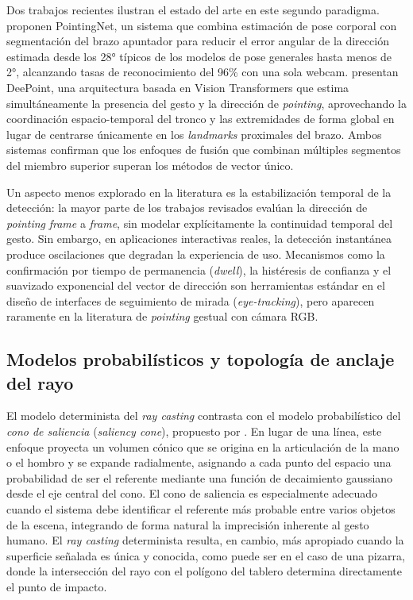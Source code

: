 \documentclass[12pt]{report} %
\begin{document}
Dos trabajos recientes ilustran el estado del arte en este segundo paradigma. \citet{bamani2025pointingnet} proponen PointingNet, un sistema que combina estimación de pose corporal con segmentación del brazo apuntador para reducir el error angular de la dirección estimada desde los 28° típicos de los modelos de pose generales hasta menos de 2°, alcanzando tasas de reconocimiento del 96\% con una sola webcam. \citet{nakamura2023deepoint} presentan DeePoint, una arquitectura basada en Vision Transformers que estima simultáneamente la presencia del gesto y la dirección de \textit{pointing}, aprovechando la coordinación espacio-temporal del tronco y las extremidades de forma global en lugar de centrarse únicamente en los \textit{landmarks} proximales del brazo. Ambos sistemas confirman que los enfoques de fusión que combinan múltiples segmentos del miembro superior superan los métodos de vector único.

Un aspecto menos explorado en la literatura es la estabilización temporal de la detección: la mayor parte de los trabajos revisados evalúan la dirección de \textit{pointing} \textit{frame} a \textit{frame}, sin modelar explícitamente la continuidad temporal del gesto. Sin embargo, en aplicaciones interactivas reales, la detección instantánea produce oscilaciones que degradan la experiencia de uso. Mecanismos como la confirmación por tiempo de permanencia (\textit{dwell}), la histéresis de confianza y el suavizado exponencial del vector de dirección son herramientas estándar en el diseño de interfaces de seguimiento de mirada (\textit{eye-tracking}), pero aparecen raramente en la literatura de \textit{pointing} gestual con cámara RGB.

\subsection{Modelos probabilísticos y topología de anclaje del rayo}

El modelo determinista del \textit{ray casting} contrasta con el modelo probabilístico del \textit{cono de saliencia} (\textit{saliency cone}), propuesto por \citet{kranstedt2005deixis}. En lugar de una línea, este enfoque proyecta un volumen cónico que se origina en la articulación de la mano o el hombro y se expande radialmente, asignando a cada punto del espacio una probabilidad de ser el referente mediante una función de decaimiento gaussiano desde el eje central del cono. El cono de saliencia es especialmente adecuado cuando el sistema debe identificar el referente más probable entre varios objetos de la escena, integrando de forma natural la imprecisión inherente al gesto humano. El \textit{ray casting} determinista resulta, en cambio, más apropiado cuando la superficie señalada es única y conocida, como puede ser en el caso de una pizarra, donde la intersección del rayo con el polígono del tablero determina directamente el punto de impacto.
\end{document}
